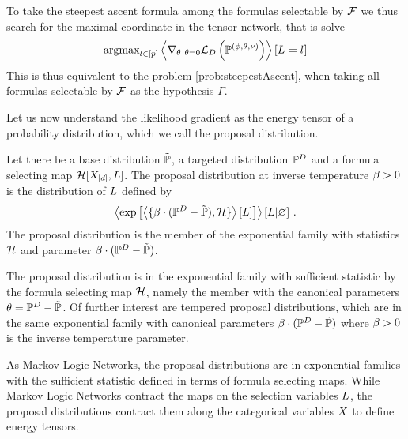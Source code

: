 %
To take the steepest ascent formula among the formulas selectable by $\mathcal{F}$ we thus search for the maximal coordinate in the tensor network, that is solve
\begin{align}
	\mathrm{argmax}_{l\in[p]} \left\langle  \nabla_{\theta}|_{\theta=0} \mathcal{L}_{D}\left(\mathbb{P}^{(\phi,\theta,\nu)}\right)\right\rangle \left[ L_{}=l_{} \right]
\end{align}
This is thus equivalent to the problem \ref{prob:steepestAscent}, when taking all formulas selectable by $\mathcal{F}$ as the hypothesis $\Gamma$.



Let us now understand the likelihood gradient as the energy tensor of a probability distribution, which we call the proposal distribution.

\begin{definition}
	Let there be a base distribution $\tilde{\mathbb{P}}$, a targeted distribution $\mathbb{P}^{D}$ and a formula selecting map $\mathcal{H}[X_{[d]}, L]$.
	The proposal distribution at inverse temperature $\beta>0$ is the distribution of $L$ defined by
	\begin{align*}
		\left\langle \mathrm{exp}\left[\left\langle \{\beta\cdot(\mathbb{P}^{D}-\tilde{\mathbb{P}}),\mathcal{H}\}\right\rangle \left[ L \right]\right] \right\rangle \left[ L | \varnothing \right] \, . 
	\end{align*}
	The proposal distribution is the member of the exponential family with statistics $\mathcal{H}$ and parameter $\beta\cdot(\mathbb{P}^{D}-\tilde{\mathbb{P}})$.
\end{definition}


The proposal distribution is in the exponential family with sufficient statistic by the formula selecting map $\mathcal{H}$, namely the member with the canonical parameters $\theta=\mathbb{P}^{D}-\tilde{\mathbb{P}}$.
Of further interest are tempered proposal distributions, which are in the same exponential family with canonical parameters $\beta\cdot(\mathbb{P}^{D}-\tilde{\mathbb{P}})$ where $\beta>0$ is the inverse temperature parameter.

As Markov Logic Networks, the proposal distributions are in exponential families with the sufficient statistic defined in terms of formula selecting maps.
While Markov Logic Networks contract the maps on the selection variables $L$, the proposal distributions contract them along the categorical variables $X$ to define energy tensors.





